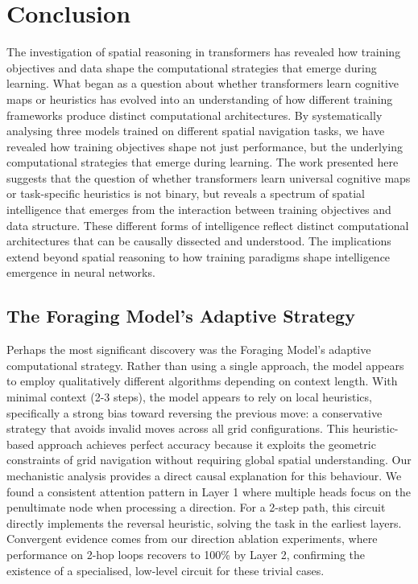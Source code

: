 \chapter{Conclusion}

The investigation of spatial reasoning in transformers has revealed how training objectives and data shape the computational strategies that emerge during learning. What began as a question about whether transformers learn cognitive maps or heuristics has evolved into an understanding of how different training frameworks produce distinct computational architectures. By systematically analysing three models trained on different spatial navigation tasks, we have revealed how training objectives shape not just performance, but the underlying computational strategies that emerge during learning. The work presented here suggests that the question of whether transformers learn universal cognitive maps or task-specific heuristics is not binary, but reveals a spectrum of spatial intelligence that emerges from the interaction between training objectives and data structure. These different forms of intelligence reflect distinct computational architectures that can be causally dissected and understood. The implications extend beyond spatial reasoning to how training paradigms shape intelligence emergence in neural networks.

\section{The Foraging Model's Adaptive Strategy}

Perhaps the most significant discovery was the Foraging Model's adaptive computational strategy. Rather than using a single approach, the model appears to employ qualitatively different algorithms depending on context length. With minimal context (2-3 steps), the model appears to rely on local heuristics, specifically a strong bias toward reversing the previous move: a conservative strategy that avoids invalid moves across all grid configurations. This heuristic-based approach achieves perfect accuracy because it exploits the geometric constraints of grid navigation without requiring global spatial understanding. Our mechanistic analysis provides a direct causal explanation for this behaviour. We found a consistent attention pattern in Layer 1 where multiple heads focus on the penultimate node when processing a direction. For a 2-step path, this circuit directly implements the reversal heuristic, solving the task in the earliest layers. Convergent evidence comes from our direction ablation experiments, where performance on 2-hop loops recovers to 100\% by Layer 2, confirming the existence of a specialised, low-level circuit for these trivial cases.

